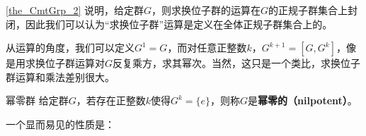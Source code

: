 




\autoref{the_CmtGrp_2} 说明，给定群$G$，则求换位子群的运算在$G$的正规子群集合上封闭，因此我们可以认为“求换位子群”运算是定义在全体正规子群集合上的。

从运算的角度，我们可以定义$G^1=G$，而对任意正整数$k$，$G^{k+1}=[G, G^{k}]$，像是用求换位子群运算对$G$反复乘方，求其幂次。当然，这只是一个类比，求换位子群运算和乘法差别很大。


\begin{definition}{幂零群}
给定群$G$，若存在正整数$k$使得$G^k=\{e\}$，则称$G$是\textbf{幂零的（nilpotent）}。
\end{definition}

一个显而易见的性质是：


\begin{theorem}{}

\end{theorem}





































